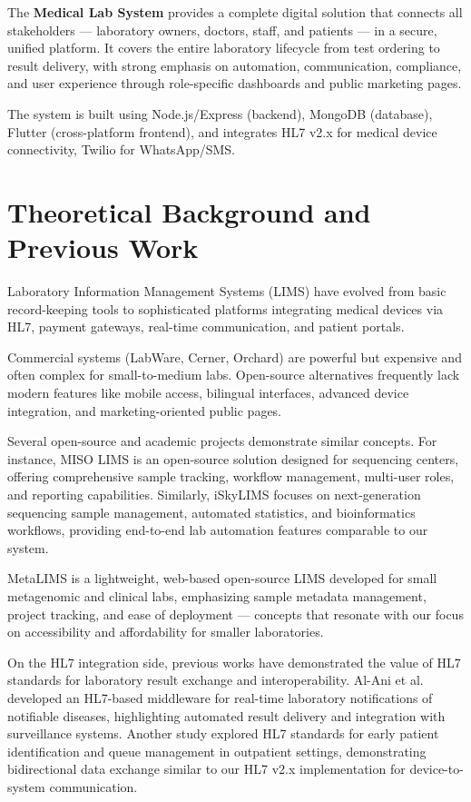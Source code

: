 \documentclass[12pt, a4paper]{report}
\begin{document}
The \textbf{Medical Lab System} provides a complete digital solution that connects all stakeholders — laboratory owners, doctors, staff, and patients — in a secure, unified platform. It covers the entire laboratory lifecycle from test ordering to result delivery, with strong emphasis on automation, communication, compliance, and user experience through role-specific dashboards and public marketing pages.

The system is built using Node.js/Express (backend), MongoDB (database), Flutter (cross-platform frontend), and integrates HL7 v2.x for medical device connectivity, Twilio for WhatsApp/SMS.
\chapter{Theoretical Background and Previous Work}
Laboratory Information Management Systems (LIMS) have evolved from basic record-keeping tools to sophisticated platforms integrating medical devices via HL7, payment gateways, real-time communication, and patient portals.

Commercial systems (LabWare, Cerner, Orchard) are powerful but expensive and often complex for small-to-medium labs. Open-source alternatives frequently lack modern features like mobile access, bilingual interfaces, advanced device integration, and marketing-oriented public pages.

Several open-source and academic projects demonstrate similar concepts. For instance, MISO LIMS \cite{miso-lims} is an open-source solution designed for sequencing centers, offering comprehensive sample tracking, workflow management, multi-user roles, and reporting capabilities. Similarly, iSkyLIMS \cite{iskylims} focuses on next-generation sequencing sample management, automated statistics, and bioinformatics workflows, providing end-to-end lab automation features comparable to our system.

MetaLIMS \cite{metalims} is a lightweight, web-based open-source LIMS developed for small metagenomic and clinical labs, emphasizing sample metadata management, project tracking, and ease of deployment — concepts that resonate with our focus on accessibility and affordability for smaller laboratories.

On the HL7 integration side, previous works have demonstrated the value of HL7 standards for laboratory result exchange and interoperability. Al-Ani et al. \cite{alani-hl7-notif} developed an HL7-based middleware for real-time laboratory notifications of notifiable diseases, highlighting automated result delivery and integration with surveillance systems. Another study \cite{alani-hl7-early} explored HL7 standards for early patient identification and queue management in outpatient settings, demonstrating bidirectional data exchange similar to our HL7 v2.x implementation for device-to-system communication.
\end{document}

